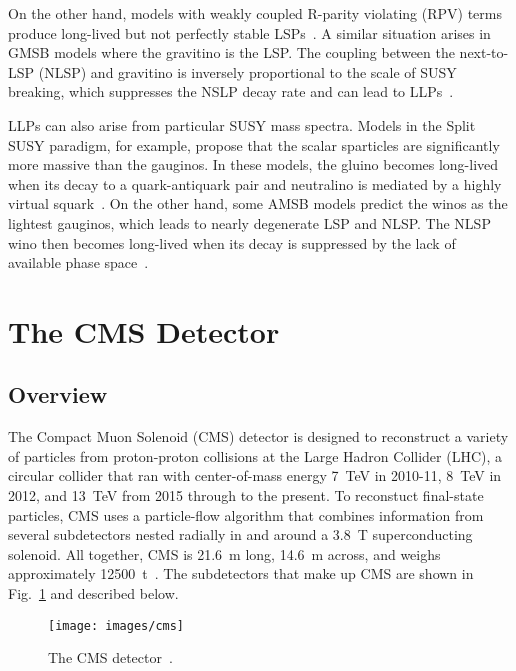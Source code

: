 \documentclass[12pt]{article}
\begin{document}
    On the other hand, models with weakly coupled R-parity violating (RPV) terms produce long-lived but not perfectly stable LSPs~\cite{fate}. A similar situation arises in GMSB models where the gravitino is the LSP. The coupling between the next-to-LSP (NLSP) and gravitino is inversely proportional to the scale of SUSY breaking, which suppresses the NSLP decay rate and can lead to LLPs~\cite{dimopoulos_low_energy}.

    LLPs can also arise from particular SUSY mass spectra. Models in the Split SUSY paradigm, for example, propose that the scalar sparticles are significantly more massive than the gauginos. In these models, the gluino becomes long-lived when its decay to a quark-antiquark pair and neutralino is mediated by a highly virtual squark~\cite{kilian_split}. On the other hand, some AMSB models predict the winos as the lightest gauginos, which leads to nearly degenerate LSP and NLSP. The NLSP wino then becomes long-lived when its decay is suppressed by the lack of available phase space~\cite{randall_sundrum_out_of_this_world}.

\section{The CMS Detector}
    \subsection{Overview}
        The Compact Muon Solenoid (CMS) detector is designed to reconstruct a variety of particles from proton-proton collisions at the Large Hadron Collider (LHC), a circular collider that ran with center-of-mass energy \SI{7}{\tera\electronvolt} in 2010-11, \SI{8}{\tera\electronvolt} in 2012, and \SI{13}{\tera\electronvolt} from 2015 through to the present. To reconstuct final-state particles, CMS uses a particle-flow algorithm that combines information from several subdetectors nested radially in and around a \SI{3.8}{\tesla} superconducting solenoid. All together, CMS is \SI{21.6}{\m} long, \SI{14.6}{\m} across, and weighs approximately \SI{12500}{t}~\cite{cms_experiment}. The subdetectors that make up CMS are shown in Fig.~\ref{cms} and described below.

        \noindent \begin{figure}[htbp] \begin{center}
        \texttt{[image: images/cms]}
        \caption{The CMS detector~\cite{cms_image}.}
        \label{cms}
        \end{center} \end{figure}
\end{document}

